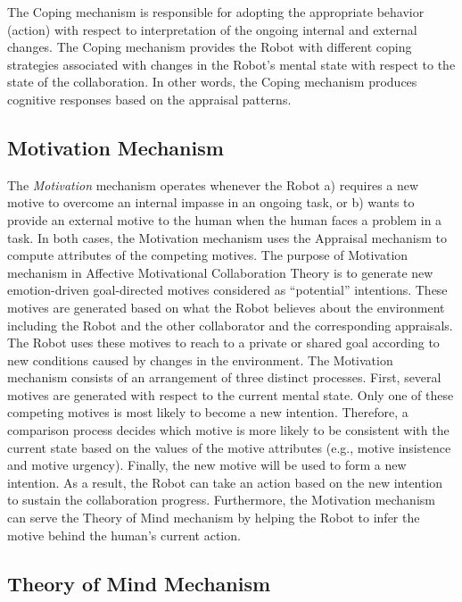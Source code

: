 The Coping mechanism is responsible for adopting the appropriate behavior
(action) with respect to interpretation of the ongoing internal and external
changes. The Coping mechanism provides the Robot with different coping
strategies associated with changes in the Robot's mental state with respect to
the state of the collaboration. In other words, the Coping mechanism produces
cognitive responses based on the appraisal patterns.

\subsection{Motivation Mechanism}
\label{sec:motivation-mech}

The \textit{Motivation} mechanism operates whenever the Robot a) requires a new
motive to overcome an internal impasse in an ongoing task, or b) wants to
provide an external motive to the human when the human faces a problem in a
task. In both cases, the Motivation mechanism uses the Appraisal mechanism to
compute attributes of the competing motives. The purpose of Motivation mechanism
in Affective Motivational Collaboration Theory is to generate new emotion-driven
goal-directed motives considered as ``potential'' intentions. These motives are
generated based on what the Robot believes about the environment including the
Robot and the other collaborator and the corresponding appraisals. The Robot
uses these motives to reach to a private or shared goal according to new
conditions caused by changes in the environment. The Motivation mechanism
consists of an arrangement of three distinct processes. First, several motives
are generated with respect to the current mental state. Only one of these
competing motives is most likely to become a new intention. Therefore, a
comparison process decides which motive is more likely to be consistent with the
current state based on the values of the motive attributes (e.g., motive
insistence and motive urgency). Finally, the new motive will be used to form a
new intention. As a result, the Robot can take an action based on the new
intention to sustain the collaboration progress. Furthermore, the Motivation
mechanism can serve the Theory of Mind mechanism by helping the Robot to infer
the motive behind the human's current action.

\subsection{Theory of Mind Mechanism}
\label{sec:tom-mech}

